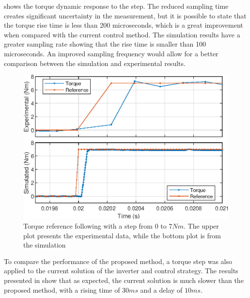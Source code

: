 \documentclass[9pt,conference]{IEEEtran}
\begin{document}
 shows the torque dynamic response to the step. The reduced sampling time creates significant uncertainty in the measurement, but it is possible to state that the torque rise time is less than 200 microseconds, which is a great improvement when compared with the current control method. The simulation results have a greater sampling rate showing that the rise time is smaller than 100 microseconds. An improved sampling frequency would allow for a better comparison between the simulation and experimental results.

\begin{figure}[!htb]
	\centering
	\includegraphics[width=1\linewidth]{Figures/Tq_step.eps}
	\caption[Torque reference following with a step from $0$ to $7Nm$.]{Torque reference following with a step from $0$ to $7Nm$. The upper plot presents the experimental data, while the bottom plot is from the simulation}
	\label{fig:tq_step_response_time} %
\end{figure}

To compare the performance of the proposed method, a torque step was also applied to the current solution of the inverter and control strategy. The results presented in  show that as expected, the current solution is much slower than the proposed method, with a rising time of $30ms$ and a delay of $10ms$. 
\end{document}

